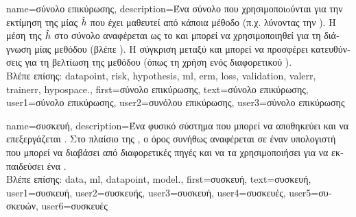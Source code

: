 {name={\foreignlanguage{greek}{σύνολο επικύρωσης}},
 	description={\foreignlanguage{greek}{Ένα σύνολο}  \foreignlanguage{greek}{που 
  		χρησιμοποι\-oύ\-νται για την εκτίμηση της}  \foreignlanguage{greek}{μίας}  $\hat{h}$ 
		\foreignlanguage{greek}{που έχει μαθευτεί από κάποια μέθοδο}  \foreignlanguage{greek}{(π.χ. λύνοντας την} ). 
		\foreignlanguage{greek}{Η μέση}  \foreignlanguage{greek}{της} $\hat{h}$ 
  		\foreignlanguage{greek}{στο σύνολο}  \foreignlanguage{greek}{αναφέρεται ως το}  
		\foreignlanguage{greek}{και μπορεί να χρησιμοποιηθεί για τη διάγνωση μίας μεθόδου}  (\foreignlanguage{greek}{βλέπε} 
		\cite[Sec. 6.6]{MLBasics}). \foreignlanguage{greek}{Η σύγκριση μεταξύ}  \foreignlanguage{greek}{και}  
		\foreignlanguage{greek}{μπορεί να προσφέρει κατευθύνσεις για τη βελτίωση της μεθόδου}  \foreignlanguage{greek}{(όπως τη 
		χρήση ενός διαφορετικού} ).\\
		\foreignlanguage{greek}{Βλέπε επίσης:} \gls{datapoint}, \gls{risk}, \gls{hypothesis}, \gls{ml}, \gls{erm}, \gls{loss}, \gls{validation}, \gls{valerr}, 
		\gls{trainerr}, \gls{hypospace}.},
	first={\foreignlanguage{greek}{σύνολο επικύρωσης}},
	text={\foreignlanguage{greek}{σύνολο επικύρωσης}},
	user1={\foreignlanguage{greek}{σύνολο επικύρωσης}}, %
	user2={\foreignlanguage{greek}{συνόλου επικύρωσης}}, %
	user3={\foreignlanguage{greek}{σύνολο επικύρωσης}} %
}

{name={\foreignlanguage{greek}{συσκευή}},
	description={\foreignlanguage{greek}{Ένα φυσικό σύστημα που μπορεί να} 
		\foreignlanguage{greek}{αποθηκεύει και να επεξεργάζεται} . \foreignlanguage{greek}{Στο πλαίσιο της} 
		, \foreignlanguage{greek}{ο όρος συνήθως αναφέρεται σε έναν υπολογιστή που μπορεί 
		να διαβάσει}  \foreignlanguage{greek}{από διαφορετικές πηγές και να τα χρησιμοποιήσει 
		για να εκπαιδεύσει ένα}   \cite{Patterson2013}. \\
		\foreignlanguage{greek}{Βλέπε επίσης:} \gls{data}, \gls{ml}, \gls{datapoint}, \gls{model}.},
	first={\foreignlanguage{greek}{συσκευή}},
	text={\foreignlanguage{greek}{συσκευή}},
	user1={\foreignlanguage{greek}{συσκευή}}, %
	user2={\foreignlanguage{greek}{συσκευής}}, %
	user3={\foreignlanguage{greek}{συσκευή}}, %
	user4={\foreignlanguage{greek}{συσκευές}}, %
	user5={\foreignlanguage{greek}{συσκευών}}, %
	user6={\foreignlanguage{greek}{συσκευές}} %
}

